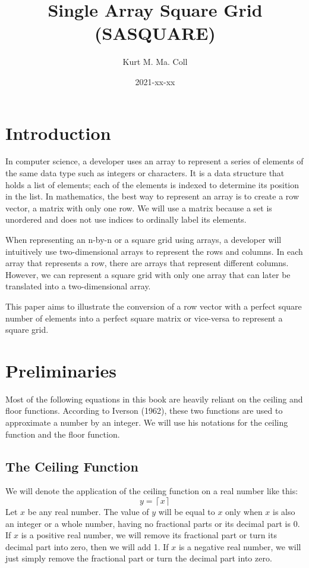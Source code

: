 \documentclass[letterpaper, twoside,12pt]{article}
\title{Single Array Square Grid (SASQUARE)}
\date{2021-xx-xx}
\author{Kurt M. Ma. Coll}
\begin{document}

    \maketitle
    \newpage

    \tableofcontents
    \newpage

    \section*{Introduction}
    In computer science, a developer uses an array to represent a series of elements of the same data type such as integers or characters. It is a data structure that holds a list of elements; each of the elements is indexed to determine its position in the list. In mathematics, the best way to represent an array is to create a row vector, a matrix with only one row. We will use a matrix because a set is unordered and does not use indices to ordinally label its elements.

    When representing an n-by-n or a square grid using arrays, a developer will intuitively use two-dimensional arrays to represent the rows and columns. In each array that represents a row, there are arrays that represent different columns. However, we can represent a square grid with only one array that can later be translated into a two-dimensional array.

    This paper aims to illustrate the conversion of a row vector with a perfect square number of elements into a perfect square matrix or vice-versa to represent a square grid.

    \newpage
    \setcounter{section}{-1}

    \section{Preliminaries}
    Most of the following equations in this book are heavily reliant on the ceiling and floor functions. According to Iverson (1962), these two functions are used to approximate a number by an integer. We will use his notations for the ceiling function and the floor function.

    \subsection{The Ceiling Function}

    We will denote the application of the ceiling function on a real number like this:
    \begin{equation}
        y = \left\lceil x \right\rceil
    \end{equation}
    Let $x$ be any real number. The value of $y$ will be equal to $x$ only when $x$ is also an integer or a whole number, having no fractional parts or its decimal part is 0. If $x$ is a positive real number, we will remove its fractional part or turn its decimal part into zero, then we will add 1. If $x$ is a negative real number, we will just simply remove the fractional part or turn the decimal part into zero.
\end{document}
